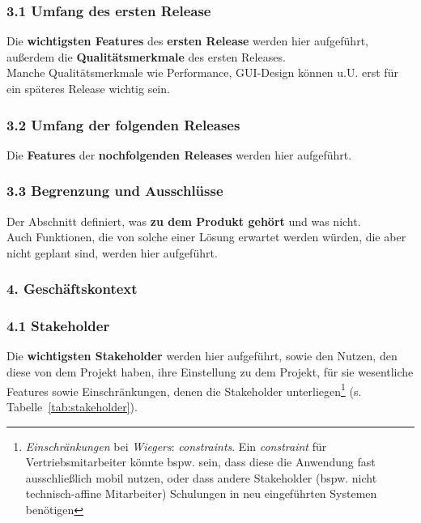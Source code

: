 \subsubsection*{3.1 Umfang des ersten Release}
Die \textbf{wichtigsten Features} des \textbf{ersten Release} werden hier aufgeführt, außerdem die \textbf{Qualitätsmerkmale} des ersten Releases.\\
Manche Qualitätsmerkmale wie Performance, GUI-Design können u.U. erst für ein späteres Release wichtig sein.

\subsubsection*{3.2 Umfang der folgenden Releases}
Die \textbf{Features} der \textbf{nochfolgenden Releases} werden hier aufgeführt.

\subsubsection*{3.3 Begrenzung und Ausschlüsse}
Der Abschnitt definiert, was \textbf{zu dem Produkt gehört} und was nicht.\\
Auch Funktionen, die von  solche einer Lösung erwartet werden würden, die aber nicht geplant sind, werden hier aufgeführt.

\subsubsection*{4. Geschäftskontext}

\subsubsection*{4.1 Stakeholder}
Die \textbf{wichtigsten Stakeholder} werden hier aufgeführt, sowie den Nutzen, den diese von dem Projekt haben, ihre Einstellung zu dem Projekt, für sie wesentliche Features sowie Einschränkungen, denen die Stakeholder unterliegen\footnote{
\textit{Einschränkungen} bei \textit{Wiegers}: \textit{constraints}. Ein \textit{constraint} für Vertriebsmitarbeiter könnte bspw. sein, dass diese die Anwendung fast ausschließlich mobil nutzen, oder dass andere Stakeholder (bspw. nicht technisch-affine Mitarbeiter) Schulungen in neu eingeführten Systemen benötigen
} (s. Tabelle~\ref{tab:stakeholder}).


